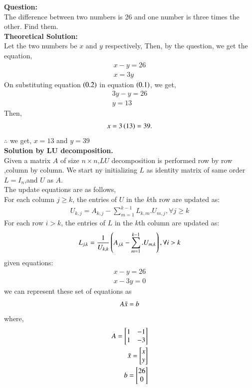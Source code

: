 \documentclass[journal]{IEEEtran}
\begin{document}
\textbf{Question:}
\\
The difference between two numbers is 26 and one number is three times the other. Find them.
\\
\textbf{ Theoretical Solution: }
\\
Let the two numbers be $x$ and $y$ respectively,
Then, by the question, we get the equation,
\begin{align} 
x - y = 26\\
x = 3y
\end{align}
On substituting equation $\left(0.2\right)$ in equation $\left(0.1\right)$, we get,
\begin{align}
    3y - y = 26\\
    y = 13
\end{align}
Then,
\begin{align}
    x = 3\left(13\right) = 39.
\end{align}
$\therefore$ we get, $x = 13$ and $y = 39$
\\
\textbf{Solution by LU decomposition.}
\\
Given a matrix $A$ of size $n\times n$,$LU$ decomposition is performed row by row ,column by column.
We start ny initializing $L$ as identity matrix of same order $L = I_n$,and $U$ as $A$.\\
The update equations are as follows,\\
For each column $j \geq k$, the entries of $U$ in the $k$th row are updated as:
\begin{align}
    U_{k,j} = A_{k,j} - \sum_{m=1}^{k-1} L_{k,m}.U_{m,j},   \forall{j \geq k}
\end{align}
For each row $i > k$, the entries of $L$ in the $k$th column are updated as:
\begin{align}
    L_{j,k} = \frac{1}{U_{k,k}}\left(A_{j,k} - \sum_{m=1}^{k-1}.U_{m,k}\right), \forall{i>k}
\end{align}
 given equations:
 \begin{align}
     x - y = 26\\
     x - 3y = 0
 \end{align}
 we can represent these set of equations as
 \begin{align}
     A\Bar{x} = b
 \end{align}
 where,
 \begin{align}
     A = \begin{bmatrix}
         1 & -1\\
         1 & -3
     \end{bmatrix} \\
     \Bar{x} = \begin{bmatrix}
         x\\
         y
     \end{bmatrix} \\
     b = \begin{bmatrix}
         26\\
         0
     \end{bmatrix}
 \end{align}
\end{document}
